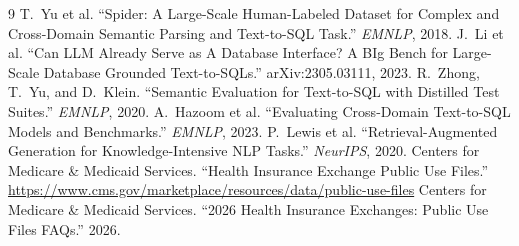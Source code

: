 \documentclass[11pt]{article}
\begin{document}
\begin{thebibliography}{9}
 T.~Yu et al. ``Spider: A Large-Scale Human-Labeled Dataset for
Complex and Cross-Domain Semantic Parsing and Text-to-SQL Task.'' \emph{EMNLP},
2018.
 J.~Li et al. ``Can LLM Already Serve as A Database Interface? A
BIg Bench for Large-Scale Database Grounded Text-to-SQLs.'' arXiv:2305.03111,
2023.
 R.~Zhong, T.~Yu, and D.~Klein. ``Semantic Evaluation for
Text-to-SQL with Distilled Test Suites.'' \emph{EMNLP}, 2020.
 A.~Hazoom et al. ``Evaluating Cross-Domain Text-to-SQL
Models and Benchmarks.'' \emph{EMNLP}, 2023.
 P.~Lewis et al. ``Retrieval-Augmented Generation for
Knowledge-Intensive NLP Tasks.'' \emph{NeurIPS}, 2020.
 Centers for Medicare \& Medicaid Services. ``Health Insurance
Exchange Public Use Files.''
\url{https://www.cms.gov/marketplace/resources/data/public-use-files}
 Centers for Medicare \& Medicaid Services. ``2026 Health
Insurance Exchanges: Public Use Files FAQs.'' 2026.
\end{thebibliography}
\end{document}
